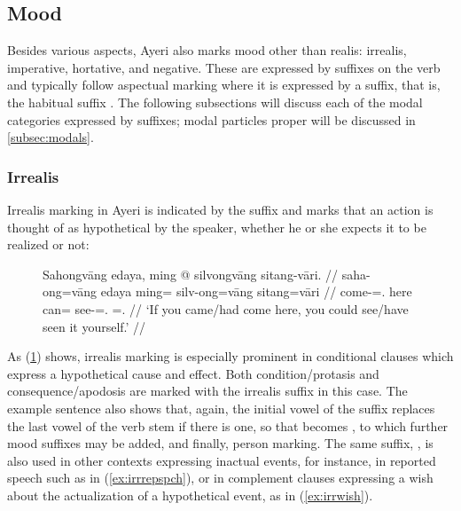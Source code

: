 \subsection{Mood}
\label{subsec:mood}

Besides various aspects, Ayeri also marks mood other than realis: irrealis,
imperative, hortative, and negative. These are expressed by suffixes on
the verb and typically follow aspectual marking where it is expressed by a
suffix, that is, the habitual suffix . The following
subsections will discuss each of the modal categories expressed by suffixes;
modal particles proper will be discussed in \autoref{subsec:modals}.

\subsubsection{Irrealis}

Irrealis marking in Ayeri is indicated by the suffix  and 
marks that an action is thought of as hypothetical by the speaker, whether he 
or she expects it to be realized or not:

\begin{figure}[h]
\ex\label{ex:irrealis}\begingl
	\gla Sahongvāng edaya, ming @ silvongvāng sitang-vāri. //
	\glb saha-ong=vāng edaya ming= silv-ong=vāng sitang=vāri //
	\glb come-\Irr{}=\Second{}.\Aarg{} here can= see-\Irr{}=\Second{}.\Aarg{} 
		\Refl{}=\Second{}.\Ins{} //
	\glft `If you came/had come here, you could see/have seen it 
		yourself.' //
\endgl\xe
\end{figure}

As (\ref{ex:irrealis}) shows, irrealis marking is especially prominent in
conditional clauses which express a hypothetical cause and effect. Both
condition/protasis and consequence/apodosis are marked with the irrealis suffix
in this case. The example sentence also shows that, again, the initial vowel of
the suffix replaces the last vowel of the verb stem if there is one, so that
 becomes , to which further mood
suffixes may be added, and finally, person marking. The same suffix,
, is also used in other contexts expressing inactual events,
for instance, in reported speech such as in (\ref{ex:irrrepspch}), or in
complement clauses expressing a wish about the actualization of a hypothetical
event, as in (\ref{ex:irrwish}).

